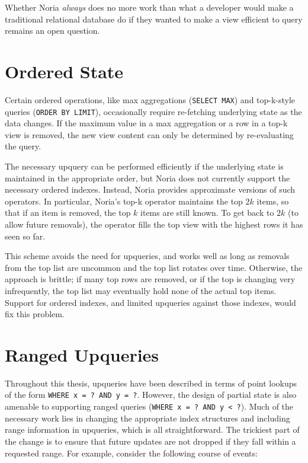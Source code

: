 
Whether Noria \emph{always} does no more work than what a developer would
make a traditional relational database do if they wanted to make a view
efficient to query remains an open question.

\section{Ordered State}
\label{s:disc:ordered}

Certain ordered operations, like max aggregations (\texttt{SELECT MAX}) and
top-k-style queries (\texttt{ORDER BY LIMIT}), occasionally require re-fetching
underlying state as the data changes. If the maximum value in a max aggregation
or a row in a top-k view is removed, the new view content can only be determined
by re-evaluating the query.

The necessary upquery can be performed efficiently if the underlying state is
maintained in the appropriate order, but Noria does not currently support the
necessary ordered indexes. Instead, Noria provides approximate versions of such
operators. In particular, Noria's top-k operator maintains the top $2k$ items,
so that if an item is removed, the top $k$ items are still known. To get back to
$2k$ (to allow future removals), the operator fills the top view with the
highest rows it has seen so far.

This scheme avoids the need for upqueries, and works well as long as removals
from the top list are uncommon and the top list rotates over time. Otherwise,
the approach is brittle; if many top rows are removed, or if the top is changing
very infrequently, the top list may eventually hold none of the actual top
items. Support for ordered indexes, and limited upqueries against those indexes,
would fix this problem.

\section{Ranged Upqueries}
\label{s:disc:ranged}

Throughout this thesis, upqueries have been described in terms of point lookups
of the form \texttt{WHERE x = ? AND y = ?}. However, the design of partial state
is also amenable to supporting ranged queries (\texttt{WHERE x = ? AND y < ?}).
Much of the necessary work lies in changing the appropriate index structures and
including range information in upqueries, which is all straightforward. The
trickiest part of the change is to ensure that future updates are not dropped if
they fall within a requested range. For example, consider the following course
of events:

